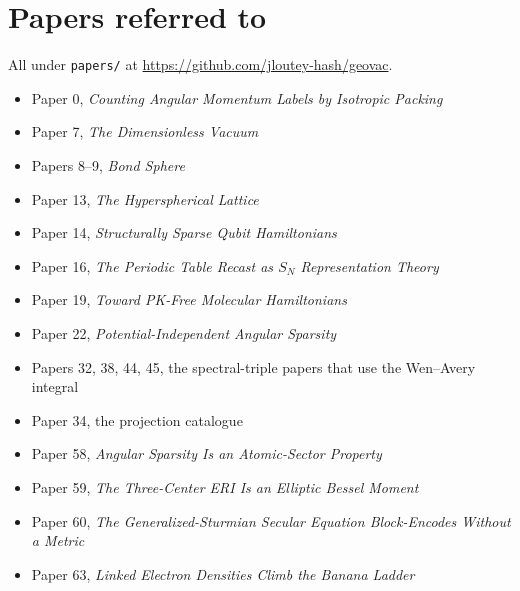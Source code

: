\documentclass[11pt]{article}
\begin{document}
\section*{Papers referred to}
All under \texttt{papers/} at \url{https://github.com/jloutey-hash/geovac}.
\begin{itemize}[leftmargin=1.2em]
\item Paper 0, \emph{Counting Angular Momentum Labels by Isotropic Packing}
\item Paper 7, \emph{The Dimensionless Vacuum}
\item Papers 8--9, \emph{Bond Sphere}
\item Paper 13, \emph{The Hyperspherical Lattice}
\item Paper 14, \emph{Structurally Sparse Qubit Hamiltonians}
\item Paper 16, \emph{The Periodic Table Recast as $S_N$ Representation Theory}
\item Paper 19, \emph{Toward PK-Free Molecular Hamiltonians}
\item Paper 22, \emph{Potential-Independent Angular Sparsity}
\item Papers 32, 38, 44, 45, the spectral-triple papers that use the Wen--Avery integral
\item Paper 34, the projection catalogue
\item Paper 58, \emph{Angular Sparsity Is an Atomic-Sector Property}
\item Paper 59, \emph{The Three-Center ERI Is an Elliptic Bessel Moment}
\item Paper 60, \emph{The Generalized-Sturmian Secular Equation Block-Encodes Without a Metric}
\item Paper 63, \emph{Linked Electron Densities Climb the Banana Ladder}
\end{itemize}
\end{document}
